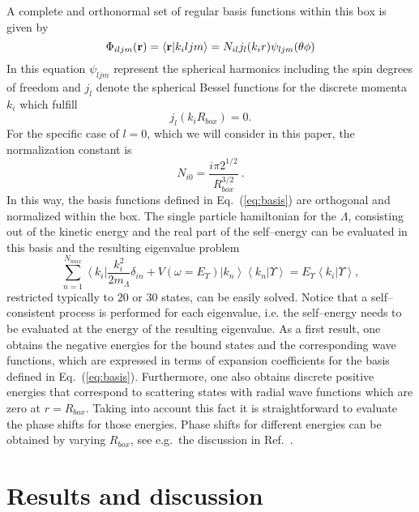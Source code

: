 A complete and orthonormal set of regular basis functions within this box is
given by
\begin{equation}
    \Phi_{iljm}({\bf r})= \left\langle {\bf r} | k_i ljm \right\rangle= 
    N_{il} j_l(k_i r) \psi_{ljm}(\theta \phi)
    \label{eq:basis}
\end{equation}
In this equation 
$\psi_{ljm}$ represent the spherical harmonics 
including the spin degrees of freedom and $j_l$ denote 
the spherical Bessel functions for the discrete momenta $k_i$ which fulfill
\begin{equation}
    j_l(k_i R_{box}) =0.
\end{equation}
For the specific case of $l=0$, which we will consider
in this paper, the normalization constant is 
\begin{equation}
N_{i0} = \frac {i \pi 2^{1/2}}{R_{box}^{3/2}} \ .
\end{equation}
In this way, the basis functions defined in Eq.\ (\ref{eq:basis}) are
orthogonal and normalized within the box.  
The single particle hamiltonian for the $\Lambda$,
consisting out of the kinetic energy and the real part of the self--energy
can be evaluated in this basis and the resulting eigenvalue problem
\begin{equation}
     \sum_{n=1}^{N_{max}} \left\langle k_i \right | \frac {k_i^2}
   {2 m_{\Lambda}} 
       \delta_{in} +V(\omega =E_{\Upsilon}) \left | k_n \right\rangle 
 \left\langle k_n | \Upsilon\right\rangle = E_{\Upsilon} \left\langle k_i |
    \Upsilon \right\rangle,
\label{eq:hamil}
\end{equation}
restricted typically to $20$ or $30$ states, can be easily solved. Notice
that a self--consistent process is performed for each eigenvalue, i.e. 
the self--energy needs to be evaluated at the energy of the resulting 
eigenvalue. 
As a first result, one obtains the negative energies for the bound states and 
the corresponding wave functions, which are
expressed in terms of expansion coefficients 
for the basis defined in
Eq.\ (\ref{eq:basis}). Furthermore, one also obtains discrete positive
energies that correspond to scattering states with radial wave functions
which are zero at $r=R_{box}$. Taking into account this fact it is
straightforward to evaluate the phase shifts for those energies. Phase
shifts for different energies can be obtained by varying $R_{box}$, see
e.g.\ the discussion in Ref.\   \cite{bbmp92}.

\section{Results and discussion}

